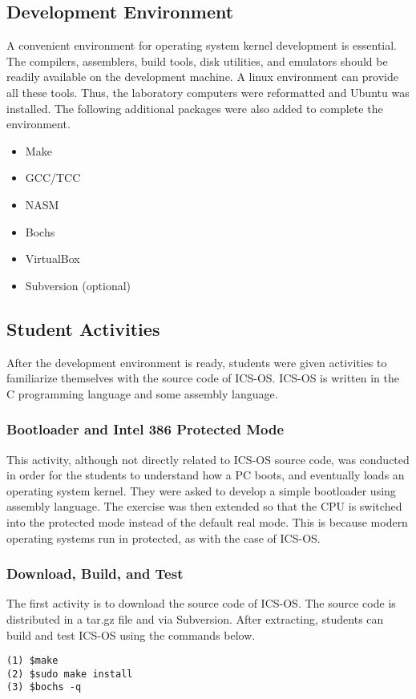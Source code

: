 \documentclass{acm_proc_article-sp}
\begin{document}
\subsection{Development Environment}
A convenient environment for operating system kernel development is essential.
The compilers, assemblers, build tools, disk utilities, and emulators should
be readily available on the development machine. A linux environment can 
provide all these tools. Thus, the laboratory computers were reformatted and
Ubuntu was installed. The following additional packages were also added to 
complete the environment.
\begin{itemize}
 \item Make
 \item GCC/TCC
 \item NASM
 \item Bochs
 \item VirtualBox
 \item Subversion (optional)
\end{itemize}

\subsection{Student Activities}
After the development environment is ready, students were given activities
to familiarize themselves with the source code of ICS-OS. ICS-OS is written
in the C programming language and some assembly language.

\subsubsection{Bootloader and Intel 386 Protected Mode}
This activity, although not directly related to ICS-OS source code, was 
conducted in order for the students to understand how a PC boots, and 
eventually loads an operating system kernel. They were asked to develop a
simple bootloader using assembly language. The exercise was then extended so
that the CPU is switched into the protected mode instead of the default 
real mode. This is because modern operating systems run in protected, 
as with the case of ICS-OS.

\subsubsection{Download, Build, and Test}
The first activity is to download the source code of ICS-OS\cite{icsos:site}.
The source code is distributed in a tar.gz file and via Subversion. 
After extracting, students can  build and test ICS-OS using the commands below.
\begin{verbatim}
(1) $make
(2) $sudo make install
(3) $bochs -q
\end{verbatim}
\end{document}
